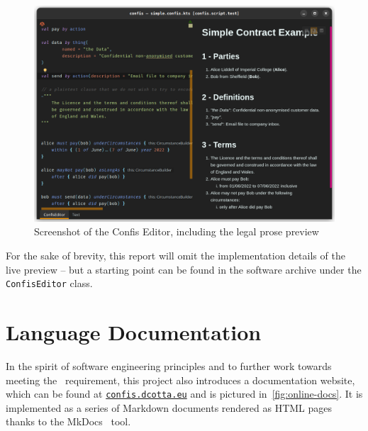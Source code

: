 \begin{figure}[h]
    \centering
    \includegraphics[width=\textwidth]{figures/simple.confis.editor}
    \caption{Screenshot of the Confis Editor, including the legal prose preview}
    \label{fig:confis.minimal.editor}
\end{figure}



For the sake of brevity, this report will omit the implementation details of the live preview -- but a starting point can be found in the software archive under the \texttt{ConfisEditor} class.


\section{Language Documentation}\label{sec:language-documentation}

In the spirit of software engineering principles and to further work towards meeting the~ requirement, this project also introduces a documentation website, which can be found at \href{https://confis.dcotta.eu}{\texttt{confis.dcotta.eu}} and is pictured in~\autoref{fig:online-docs}.
It is implemented as a series of Markdown documents rendered as HTML pages thanks to the MkDocs~\cite{mkDocs} tool.

